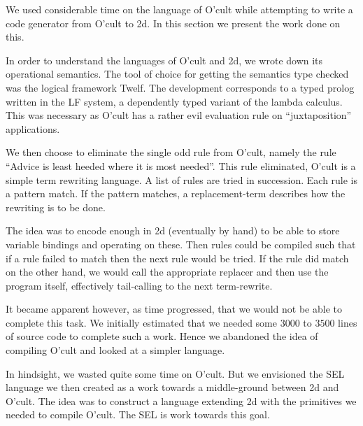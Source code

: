 
We used considerable time on the language of O'cult while attempting
to write a code generator from O'cult to 2d. In this section we
present the work done on this.

In order to understand the languages of O'cult and 2d, we wrote down
its operational semantics. The tool of choice for getting the
semantics type checked was the logical framework Twelf. The
development corresponds to a typed prolog written in the LF system, a
dependently typed variant of the lambda calculus. This was necessary
as O'cult has a rather evil evaluation rule on ``juxtaposition''
applications.

We then choose to eliminate the single odd rule from O'cult, namely
the rule ``Advice is least heeded where it is most needed''. This rule
eliminated, O'cult is a simple term rewriting language. A list of
rules are tried in succession. Each rule is a pattern match. If the
pattern matches, a replacement-term describes how the rewriting is to
be done.

The idea was to encode enough in 2d (eventually by hand) to be able to
store variable bindings and operating on these. Then rules could be
compiled such that if a rule failed to match then the next rule would
be tried. If the rule did match on the other hand, we would call the
appropriate replacer and then use the program itself, effectively
tail-calling to the next term-rewrite.

It became apparent however, as time progressed, that we would not be
able to complete this task. We initially estimated that we needed some
$3000$ to $3500$ lines of source code to complete such a work. Hence
we abandoned the idea of compiling O'cult and looked at a simpler
language.

In hindsight, we wasted quite some time on O'cult. But we envisioned
the SEL language we then created as a work towards a middle-ground
between 2d and O'cult. The idea was to construct a language extending
2d with the primitives we needed to compile O'cult. The SEL is work
towards this goal.

